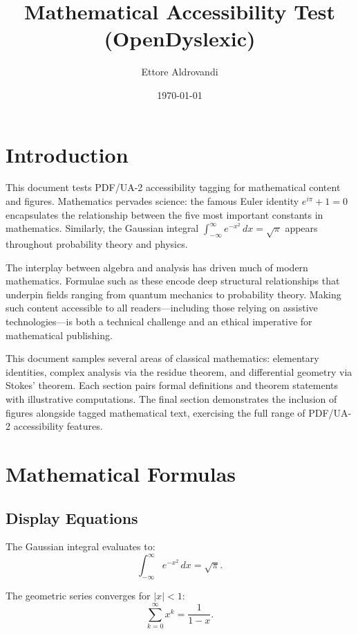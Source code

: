 \documentclass{article}
\begin{document}
\title{Mathematical Accessibility Test (OpenDyslexic)}
\author{Ettore Aldrovandi}
\date{\today}
\maketitle

\section{Introduction}

This document tests PDF/UA-2 accessibility tagging for mathematical content and figures.
Mathematics pervades science: the famous Euler identity $e^{i\pi} + 1 = 0$ encapsulates
the relationship between the five most important constants in mathematics.  Similarly,
the Gaussian integral
$\int_{-\infty}^{\infty} e^{-x^2}\,dx = \sqrt{\pi}$
appears throughout probability theory and physics.

The interplay between algebra and analysis has driven much of modern mathematics.
Formulae such as these encode deep structural relationships that underpin fields
ranging from quantum mechanics to probability theory. Making such content accessible
to all readers---including those relying on assistive technologies---is both a
technical challenge and an ethical imperative for mathematical publishing.

This document samples several areas of classical mathematics: elementary identities,
complex analysis via the residue theorem, and differential geometry via Stokes'
theorem. Each section pairs formal definitions and theorem statements with illustrative
computations. The final section demonstrates the inclusion of figures alongside tagged
mathematical text, exercising the full range of PDF/UA-2 accessibility features.

\section{Mathematical Formulas}

\subsection{Display Equations}

The Gaussian integral evaluates to:
\begin{equation}
  \int_{-\infty}^{\infty} e^{-x^2}\,dx = \sqrt{\pi}.
\end{equation}

The geometric series converges for $|x| < 1$:
\begin{equation}
  \sum_{k=0}^{\infty} x^k = \frac{1}{1-x}.
\end{equation}
\end{document}
